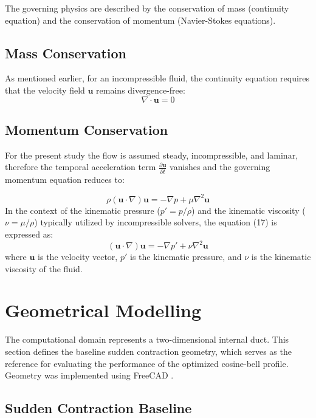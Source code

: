 \documentclass[12pt, a4paper]{article}
\begin{document}
The governing physics are described by the conservation of mass (continuity equation) and the conservation of momentum (Navier-Stokes equations).

\subsection{Mass Conservation}
As mentioned earlier, for an incompressible fluid, the continuity equation requires that the velocity field $\mathbf{u}$ remains divergence-free:
\begin{equation}
	\nabla \cdot \mathbf{u} = 0
\end{equation}

\subsection{Momentum Conservation}
For the present study the flow is assumed steady, incompressible, and laminar, therefore the temporal acceleration term $\frac{\partial \mathbf{u}}{\partial t}$ vanishes and the governing momentum equation reduces to:

\begin{equation}
	\rho (\mathbf{u} \cdot \nabla)\mathbf{u} = -\nabla p + \mu \nabla^2 \mathbf{u}
\end{equation}
In the context of the kinematic pressure ($p' = p/\rho$) and the kinematic viscosity ($\nu = \mu/\rho$) typically utilized by incompressible solvers, the equation (17) is expressed as:
\begin{equation}
	(\mathbf{u} \cdot \nabla)\mathbf{u} = -\nabla p' + \nu \nabla^2 \mathbf{u}
\end{equation}
where $\mathbf{u}$ is the velocity vector, $p'$ is the kinematic pressure, and $\nu$ is the kinematic viscosity of the fluid.

\section{Geometrical Modelling}

The computational domain represents a two-dimensional internal duct. This section defines the baseline sudden contraction geometry, which serves as the reference for evaluating the performance of the optimized cosine-bell profile. Geometry was implemented using FreeCAD \cite{freecad}.
\subsection{Sudden Contraction Baseline}
\end{document}
